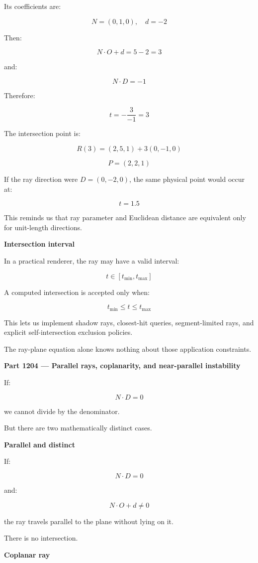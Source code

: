 Its coefficients are:

\[
N=(0,1,0),\quad d=-2
\]

Then:

\[
N\cdot O+d=5-2=3
\]

and:

\[
N\cdot D=-1
\]

Therefore:

\[
t=-\frac3{-1}=3
\]

The intersection point is:

\[
R(3)=(2,5,1)+3(0,-1,0)
\]

\[
\boxed{P=(2,2,1)}
\]

If the ray direction were \(D=(0,-2,0)\), the same physical point would occur at:

\[
t=1.5
\]

This reminds us that ray parameter and Euclidean distance are equivalent only for unit-length directions.

\textbf{Intersection interval}

In a practical renderer, the ray may have a valid interval:

\[
t\in[t_{\min},t_{\max}]
\]

A computed intersection is accepted only when:

\[
\boxed{ t_{\min}\le t\le t_{\max} }
\]

This lets us implement shadow rays, closest-hit queries, segment-limited rays, and explicit self-intersection exclusion policies.

The ray-plane equation alone knows nothing about those application constraints.

\textbf{Part 1204 --- Parallel rays, coplanarity, and near-parallel instability}

If:

\[
N\cdot D=0
\]

we cannot divide by the denominator.

But there are two mathematically distinct cases.

\textbf{Parallel and distinct}

If:

\[
N\cdot D=0
\]

and:

\[
N\cdot O+d\ne0
\]

the ray travels parallel to the plane without lying on it.

There is no intersection.

\textbf{Coplanar ray}

